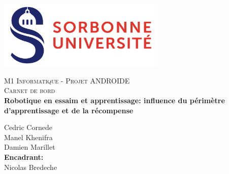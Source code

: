 \documentclass[11pt]{article}
\begin{document}
  \center \includegraphics[width=8cm]{logo.png}

\begin{center}
\textsc{\Large M1 Informatique - Projet ANDROIDE}\\[0.5cm]
\textsc{\Large  Carnet de bord }\\[0.5cm]
\textbf{Robotique en essaim et apprentissage: influence du périmètre d'apprentissage et de la récompense} \\[3cm]
\end{center}


\begin{center}
Cedric Cornede\\[0.3cm]
Manel Khenifra\\[0.3cm]
Damien Marillet\\[0.8cm]
\textbf{Encadrant:}\\
Nicolas Bredeche \\[0.4cm]
\end{center}


\newpage
\tableofcontents
\newpage
\end{document}

